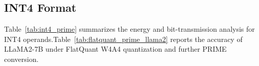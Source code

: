 \begin{table}[htbp]
  \centering
  \scriptsize
  \caption{MMLU accuracy of Qwen3-0.6B-FP8 before and after PRIME conversion.}
  \label{tab:qwen3_fp8_mmlu}
\end{table}

\subsection{INT4 Format}

Table~\ref{tab:int4_prime} summarizes the energy and bit-transmission analysis for INT4 operands.Table~\ref{tab:flatquant_prime_llama2} reports the accuracy of LLaMA2-7B under FlatQuant W4A4 quantization and further PRIME conversion.

\begin{table}[htbp]
  \centering
  \scriptsize
  \caption{Energy and bit-transmission cost of INT4 format after PRIME conversion.}
  \label{tab:int4_prime}
\end{table}

